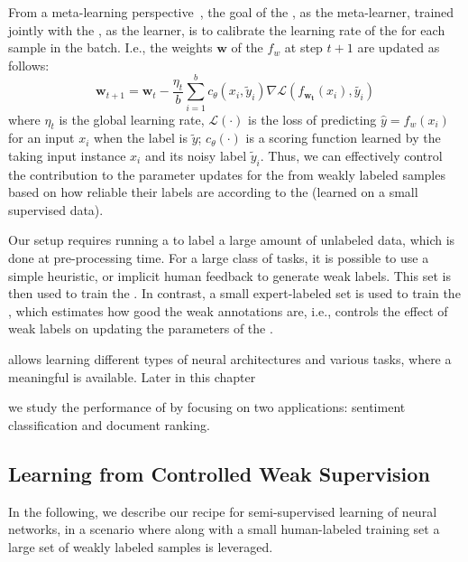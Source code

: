 From a meta-learning perspective~\citep{Andrychowicz:2016,Finn2017:ICML,Ravi:2016}, the goal of the \cnet, as the meta-learner, trained jointly with the \tnet, as the learner, is to calibrate the learning rate of the \tnet for each sample in the batch. I.e., the weights $\pmb{w}$ of the \tnet $f_w$ at step $t+1$ are updated as follows:
\begin{equation}
\pmb{w}_{t+1} = \pmb{w}_t - \frac{\eta_t}{b}\sum_{i=1}^b c_{\theta}(x_i, \tilde{y}_i)  \nabla \mathcal{L}(f_{\pmb{w_t}}(x_i), \tilde{y_i})
\end{equation}
where $\eta_t$ is the global learning rate, $\mathcal{L}(\cdot)$ is the loss of predicting $\hat{y}=f_w(x_i)$ for an input $x_i$ when the label is $\tilde{y}$; $c_\theta(\cdot)$ is a scoring function learned by the \cnet taking input instance $x_i$ and its noisy label $\tilde{y}_i$. Thus, we can effectively control the contribution to the parameter updates for the \tnet from weakly labeled samples based on how reliable their labels are according to the \cnet (learned on a small supervised data).

Our setup requires running a \wa to label a large amount of unlabeled data, which is done at pre-processing time. For a large class of tasks, it is possible to use a simple heuristic, or implicit human feedback to generate weak labels. This set is then used to train the \tnet.  
In contrast, a small expert-labeled set is used to train the \cnet, which estimates how good the weak annotations are, i.e., controls the effect of weak labels on updating the parameters of the \tnet.

\cws allows learning different types of neural architectures and various tasks, where a meaningful \wa is available. 
Later in this chapter 

we study the performance of \cws by focusing on two applications: sentiment classification and document ranking. 

\subsection{Learning from Controlled Weak Supervision}
\label{sec:method}
In the following, we describe our recipe for semi-supervised learning of neural networks, in a scenario where along with a small human-labeled training set a large set of weakly labeled samples is leveraged.

